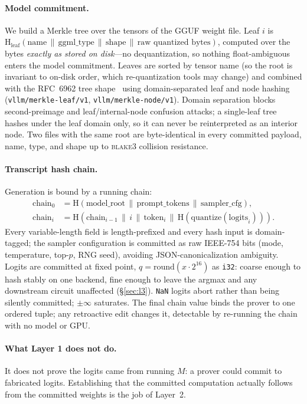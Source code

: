 \documentclass[11pt]{article}
\newcommand{\code}[1]{\texttt{#1}}
\begin{document}
\paragraph{Model commitment.} We build a Merkle tree over the tensors of the
GGUF weight file. Leaf $i$ is
$\text{H}_{\text{leaf}}(\text{name}\,\|\,\text{ggml\_type}\,\|\,\text{shape}\,\|\,\text{raw quantized bytes})$,
computed over the bytes \emph{exactly as stored on disk}---no dequantization, so
nothing float-ambiguous enters the model commitment. Leaves are sorted by tensor
name (so the root is invariant to on-disk order, which re-quantization tools may
change) and combined with the RFC~6962 tree shape~\cite{rfc6962} using
domain-separated leaf and node hashing (\code{vllm/merkle-leaf/v1},
\code{vllm/merkle-node/v1}). Domain separation blocks second-preimage and
leaf/internal-node confusion attacks; a single-leaf tree hashes under the leaf
domain only, so it can never be reinterpreted as an interior node. Two files
with the same root are byte-identical in every committed payload, name, type,
and shape up to \textsc{blake3} collision resistance.

\paragraph{Transcript hash chain.} Generation is bound by a running chain:
\begin{align*}
\text{chain}_0 &= \text{H}(\text{model\_root} \,\|\, \text{prompt\_tokens} \,\|\, \text{sampler\_cfg}),\\
\text{chain}_i &= \text{H}(\text{chain}_{i-1} \,\|\, i \,\|\, \text{token}_i \,\|\, \text{H}(\text{quantize}(\text{logits}_i))).
\end{align*}
Every variable-length field is length-prefixed and every hash input is
domain-tagged; the sampler configuration is committed as raw IEEE-754 bits (mode,
temperature, top-$p$, RNG seed), avoiding JSON-canonicalization ambiguity.
Logits are committed at fixed point, $q = \mathrm{round}(x \cdot 2^{16})$ as
\code{i32}: coarse enough to hash stably on one backend, fine enough to leave the
argmax and any downstream circuit unaffected (\S\ref{sec:l3}). \code{NaN} logits
abort rather than being silently committed; $\pm\infty$ saturates. The final
chain value binds the prover to one ordered tuple; any retroactive edit changes
it, detectable by re-running the chain with no model or GPU.

\paragraph{What Layer 1 does not do.} It does not prove the logits came from
running $M$: a prover could commit to fabricated logits. Establishing that the
committed computation actually follows from the committed weights is the job of
Layer~2.
\end{document}
